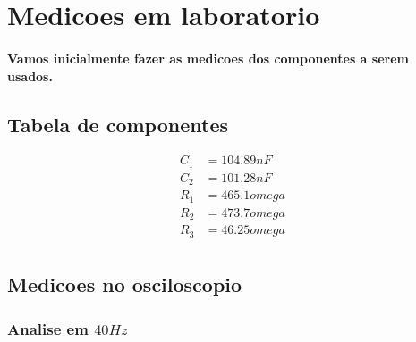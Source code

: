 \documentclass[12pt,twoside, a4paper, twocolumn]{article}
\begin{document}
\section{Medicoes em laboratorio}

\paragraph{Vamos inicialmente fazer as medicoes dos componentes a serem usados.}

\subsection{Tabela de componentes}

\begin{equation*}
    \begin{aligned}
        C_1 & = 104.89nF    \\
        C_2 & = 101.28nF    \\
        R_1 & = 465.1 omega \\
        R_2 & = 473.7 omega \\
        R_3 & = 46.25 omega \\
    \end{aligned}
\end{equation*}

\subsection{Medicoes no osciloscopio}

\subsubsection*{Analise em $40Hz$}
\subparagraph*{}
\end{document}
